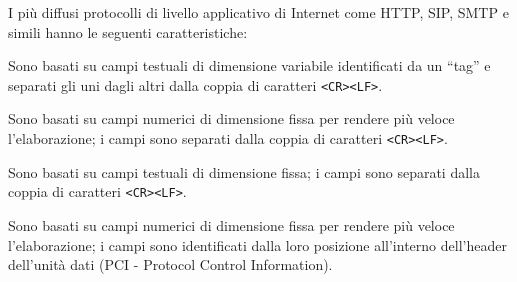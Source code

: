 \question[1]
I più diffusi protocolli di livello applicativo di Internet come HTTP, SIP, SMTP e simili hanno le seguenti caratteristiche:

\begin{checkboxes}
	\CorrectChoice Sono basati su campi testuali di dimensione variabile identificati da un \enquote{tag} e separati gli uni dagli altri dalla coppia di caratteri \texttt{<CR><LF>}.

	\choice Sono basati su campi numerici di dimensione fissa per rendere più veloce l'elaborazione; i campi sono separati dalla coppia di caratteri \texttt{<CR><LF>}.

	\choice Sono basati su campi testuali di dimensione fissa; i campi sono separati dalla coppia di caratteri \texttt{<CR><LF>}.

	\choice Sono basati su campi numerici di dimensione fissa per rendere più veloce l'elaborazione; i campi sono identificati dalla loro posizione all'interno dell'header dell'unità dati (PCI - Protocol Control Information).
\end{checkboxes}

